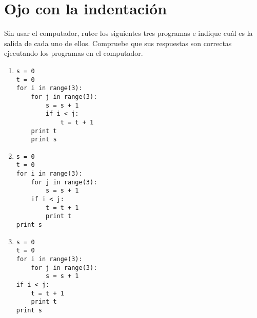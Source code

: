 \section{Ojo con la indentación}

Sin usar el computador, rutee los siguientes tres programas e indique
cuál es la salida de cada uno de ellos.
Compruebe que sus respuestas son correctas
ejecutando los programas en el computador.

\begin{enumerate}
\item
\begin{lstlisting}
s = 0
t = 0
for i in range(3):
    for j in range(3):
        s = s + 1
        if i < j:
            t = t + 1
    print t
    print s
\end{lstlisting}

\item
\begin{lstlisting}
s = 0
t = 0
for i in range(3):
    for j in range(3):
        s = s + 1
    if i < j:
        t = t + 1
        print t
print s
\end{lstlisting}

\item
\begin{lstlisting}
s = 0
t = 0
for i in range(3):
    for j in range(3):
        s = s + 1
if i < j:
    t = t + 1
    print t
print s
\end{lstlisting}
\end{enumerate}

